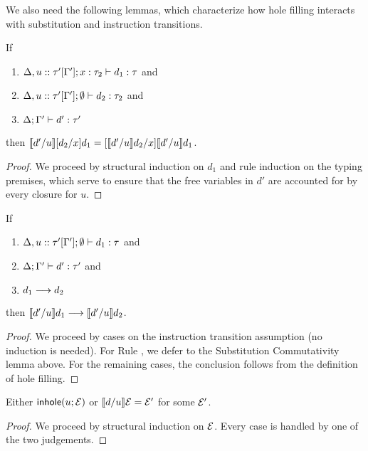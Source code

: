 We also need the following lemmas, which characterize how hole filling interacts with substitution and instruction transitions. 
\begin{lem}
  If
  \begin{enumerate}[nolistsep]
  	\item $\Delta, u :: \tau'[\Gamma']; x : \tau_2 \vdash d_1 : \tau$ and
  	\item $\Delta, u :: \tau'[\Gamma']; \emptyset \vdash d_2 : \tau_2$ and
  	\item $\Delta; \Gamma' \vdash d' : \tau'$
  \end{enumerate}

  then  $\llbracket d' / u\rrbracket [d_2/x]d_1 = [\llbracket d' / u\rrbracket d_2/x]\llbracket d' / u\rrbracket d_1$.
\end{lem}
\begin{proof}
We proceed by structural induction on $d_1$ and rule induction on the typing premises, which serve to ensure that the free
variables in $d'$ are accounted for by every closure for $u$.
\end{proof}

\begin{lem}
  If
  \begin{enumerate}[nolistsep]
  	\item $\Delta, u :: \tau'[\Gamma']; \emptyset \vdash d_1 : \tau$ and
  	\item $\Delta; \Gamma' \vdash d' : \tau'$ and
  	\item $d_1 \longrightarrow d_2$
  \end{enumerate}

  then $\llbracket d' / u\rrbracket d_1 \longrightarrow \llbracket d' / u\rrbracket d_2$.
\end{lem}
\begin{proof}
We proceed by cases on the instruction transition assumption (no induction is needed). For Rule , we defer to the Substitution Commutativity lemma above. For the remaining cases, the conclusion follows from the definition of hole filling.
\end{proof}

\begin{lem}
Either $\mathsf{inhole}(u; \mathcal{E})$ or $\llbracket d / u\rrbracket \mathcal{E}=\mathcal{E}'$ for some $\mathcal{E}'$.
\end{lem}
\begin{proof} We proceed by structural induction on $\mathcal{E}$. Every case is handled by one of the two judgements. \end{proof}

